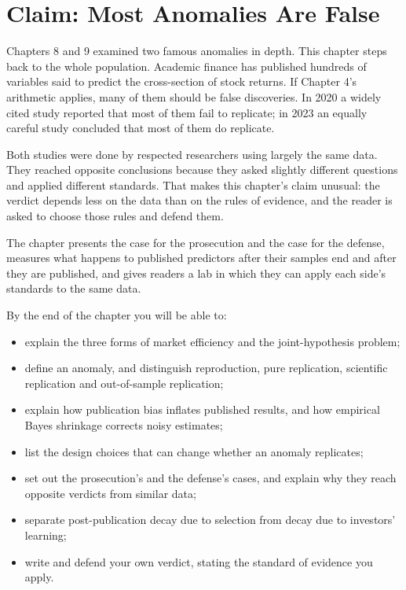 \makeatletter
{}
\makeatother

\chapter{Claim: Most Anomalies Are False}
\label{ch:10}

Chapters 8 and 9 examined two famous anomalies in depth. This chapter steps back to the whole population. Academic finance has published hundreds of variables said to predict the cross-section of stock returns. If Chapter 4's arithmetic applies, many of them should be false discoveries. In 2020 a widely cited study reported that most of them fail to replicate; in 2023 an equally careful study concluded that most of them do replicate.

Both studies were done by respected researchers using largely the same data. They reached opposite conclusions because they asked slightly different questions and applied different standards. That makes this chapter's claim unusual: the verdict depends less on the data than on the rules of evidence, and the reader is asked to choose those rules and defend them.

The chapter presents the case for the prosecution and the case for the defense, measures what happens to published predictors after their samples end and after they are published, and gives readers a lab in which they can apply each side's standards to the same data.

By the end of the chapter you will be able to:

\begin{itemize}
  \item explain the three forms of market efficiency and the joint-hypothesis problem;
  \item define an anomaly, and distinguish reproduction, pure replication, scientific replication and out-of-sample replication;
  \item explain how publication bias inflates published results, and how empirical Bayes shrinkage corrects noisy estimates;
  \item list the design choices that can change whether an anomaly replicates;
  \item set out the prosecution's and the defense's cases, and explain why they reach opposite verdicts from similar data;
  \item separate post-publication decay due to selection from decay due to investors' learning;
  \item write and defend your own verdict, stating the standard of evidence you apply.
\end{itemize}

